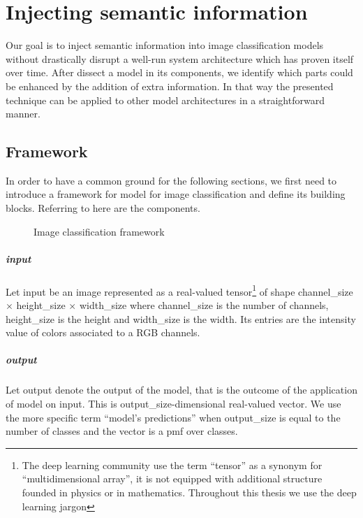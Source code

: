 \chapter{Injecting semantic information}
\label{ch:injecting-semantic-information}

%
Our goal is to inject semantic information into image classification models
without drastically disrupt a well-run system architecture which has proven
itself over time. After dissect a model in its components, we identify which
parts could be enhanced by the addition of extra information. In that way the
presented technique can be applied to other model architectures in a
straightforward manner.

\section{Framework}
\label{sec:framework}

In order to have a common ground for the following sections, we first need to
introduce a framework for model for image classification and define its building
blocks. Referring to  here are the components.

\begin{figure}[htbp]
  \caption{Image classification framework}
  \label{fig:1_framework}
\end{figure}

\paragraph{input} Let \gls{input} be an image represented as a real-valued
tensor\footnote{The deep learning community use the term ``tensor'' as a
synonym for ``multidimensional array'', it is not equipped with additional
structure founded in physics or in mathematics. Throughout this thesis we use
the deep learning jargon} of shape \gls{channel_size} $\times$ \gls{height_size}
$\times$ \gls{width_size} where \gls{channel_size} is the number of channels,
\gls{height_size} is the height and \gls{width_size} is the width. Its entries
are the intensity value of colors associated to a RGB channels.

\paragraph{output} Let \gls{output} denote the output of the model, that is the
outcome of the application of \gls{model} on \gls{input}. This is
\gls{output_size}-dimensional real-valued vector. We use the more specific term
``model's predictions'' when \gls{output_size} is equal to the number of
classes and the vector is a \acrlong{pmf} over classes.

